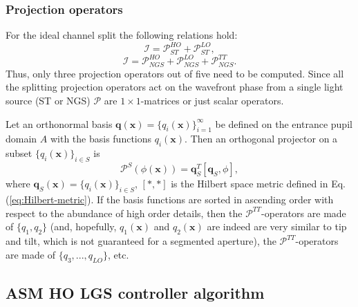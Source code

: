 \subsubsection{Projection operators}
\label{subsubsec:projection-operators}

For the ideal channel split the following relations hold:
\begin{equation} \label{eq:HO-split}
	\mathcal{I} = \mathcal{P}_{ST}^{HO} + \mathcal{P}_{ST}^{LO},
\end{equation}
\begin{equation} \label{eq:HO-LO-TT-split}
	\mathcal{I} = \mathcal{P}_{NGS}^{HO} + \mathcal{P}_{NGS}^{LO} +
	              \mathcal{P}_{NGS}^{TT}.
\end{equation}
Thus, only three projection operators out of five need to be computed. Since
all the splitting projection operators act on the wavefront phase from a single
light source (ST or NGS) $\mathcal{P}$ are $1 \times 1$-matrices or just
scalar operators.

Let an
orthonormal basis $\bm{q}(\bm{x}) = \{ q_{i}(\bm{x}) \}_{i=1}^{\infty} $ be
defined on the entrance pupil domain $A$ with the basis functions
$q_{i}(\bm{x})$.
Then an orthogonal projector on a subset $ \{ q_{i}(\bm{x}) \}_{i \in S} $ is
\begin{equation} \label{eq:orthogonal-projector-def}
	\mathcal{P}^{S} ( \phi(\bm{x}) ) = \bm{q}^{T}_{S} [\bm{q}_{S}^{},\phi],
\end{equation}
where $\bm{q}_{S}^{} (\bm{x}) = \{ q_{i} (\bm{x}) \}_{i \in S}$, $[*,*]$ is the
Hilbert space metric defined in Eq. (\ref{eq:Hilbert-metric}). If the basis
functions are sorted in ascending order with respect to the abundance of high
order details, then the $\mathcal{P}^{TT}$-operators are made of
$\{ q_{1},q_{2} \}$ (and, hopefully, $q_{1}(\bm{x})$ and $q_{2}(\bm{x})$ are
indeed are very similar to tip and tilt, which is not guaranteed for a
segmented aperture), the $\mathcal{P}^{TT}$-operators are made of
$\{ q_{3}, ..., q_{LO}^{} \}$, etc.


\subsection{ASM HO LGS controller algorithm}
